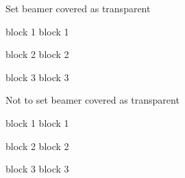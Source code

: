 \documentclass{beamer}
\begin{document}
\begin{frame}{Set beamer covered as transparent}
\begin{block}{block 1}
  block 1
\end{block}\pause
\begin{block}{block 2}
  block 2
\end{block}\pause
\begin{block}{block 3}
  block 3
\end{block}
\end{frame}

\setbeamercovered{} 
\begin{frame}{Not to set beamer covered as transparent}
\begin{block}{block 1}
  block 1
\end{block}\pause
\begin{block}{block 2}
  block 2
\end{block}\pause
\begin{block}{block 3}
  block 3
\end{block}
\end{frame}
\end{document}
